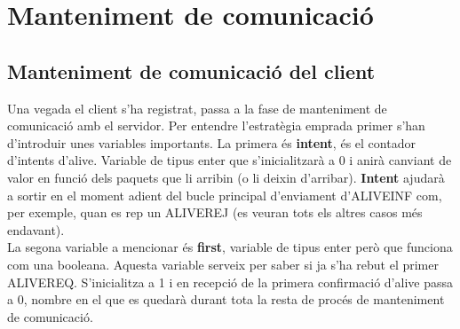 \documentclass{article}
\begin{document}
\section{Manteniment de comunicació}
\subsection{Manteniment de comunicació del client}

Una vegada el client s'ha registrat, passa a la fase de manteniment
de comunicació amb el servidor. Per entendre l'estratègia emprada
primer s'han d'introduir unes variables importants. La primera
és \textbf{intent}, és el contador d'intents d'alive. Variable de tipus 
enter que s'inicialitzarà a
0 i anirà canviant de valor en funció dels paquets que li arribin (o li
deixin d'arribar). \textbf{Intent} ajudarà a sortir en el moment adient
del bucle principal d'enviament d'ALIVE\textunderscore INF com, per 
exemple, quan es rep un ALIVE\textunderscore REJ (es veuran tots els 
altres casos més endavant).\\

La segona variable a mencionar és \textbf{first}, variable de tipus enter
però que funciona com una booleana. Aquesta variable serveix per saber si
ja s'ha rebut el primer ALIVE\textunderscore REQ. S'inicialitza a 1 i 
en recepció de la primera confirmació d'alive passa a 0, nombre en 
el que es quedarà durant tota la resta de procés de manteniment 
de comunicació.\\
\end{document}
